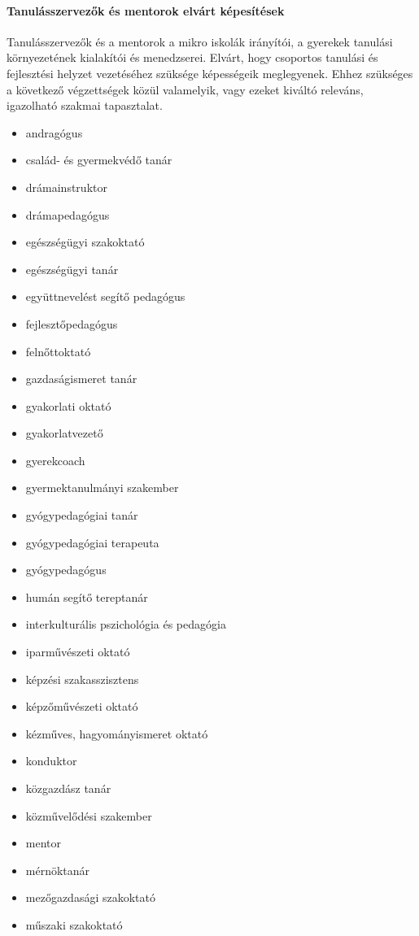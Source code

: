 \paragraph{Tanulásszervezők és mentorok elvárt képesítések} Tanulásszervezők és a mentorok a mikro iskolák irányítói, a gyerekek tanulási környezetének kialakítói és menedzserei. Elvárt, hogy csoportos tanulási és fejlesztési helyzet vezetéséhez szüksége képességeik meglegyenek. Ehhez szükséges a következő végzettségek közül valamelyik, vagy ezeket kiváltó releváns, igazolható szakmai tapasztalat.
\begin{itemize}
\item andragógus
\item család- és gyermekvédő tanár
\item drámainstruktor
\item drámapedagógus
\item egészségügyi szakoktató
\item egészségügyi tanár
\item együttnevelést segítő pedagógus
\item fejlesztőpedagógus
\item felnőttoktató
\item gazdaságismeret tanár
\item gyakorlati oktató
\item gyakorlatvezető
\item gyerekcoach
\item gyermektanulmányi szakember
\item gyógypedagógiai tanár
\item gyógypedagógiai terapeuta
\item gyógypedagógus
\item humán segítő tereptanár
\item interkulturális pszichológia és pedagógia
\item iparművészeti oktató
\item képzési szakasszisztens
\item képzőművészeti oktató
\item kézműves, hagyományismeret oktató
\item konduktor
\item közgazdász tanár
\item közművelődési szakember
\item mentor
\item mérnöktanár
\item mezőgazdasági szakoktató
\item műszaki szakoktató

\end{itemize}
